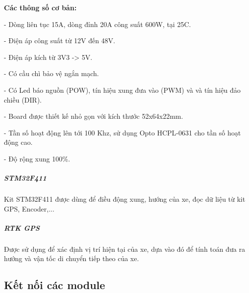 \documentclass[a4paper, 12pt]{article}
\begin{document}
\textbf{Các thông số cơ bản:}

 	- Dòng liên tục 15A, dòng đỉnh 20A công suất 600W, tại 25\degree C.
 	
	- Điện áp công suất từ 12V đến 48V.
	
	- Điện áp kích từ 3V3 -> 5V.
	
	- Có cầu chì bảo vệ ngắn mạch.
	
	- Có Led báo nguồn (POW), tín hiệu xung đưa vào (PWM) và và tín hiệu đảo chiều (DIR).
	
	- Board được thiết kế nhỏ gọn với kích thước 52x64x22mm.
	
	- Tần số hoạt động lên tới 100 Khz, sử dụng Opto HCPL-0631 cho tần số hoạt động cao.
	
	- Độ rộng xung 100\%.
\subparagraph{STM32F411}
Kit STM32F411 được dùng để điều động xung, hướng của xe, đọc dữ liệu từ kit GPS, Encoder,...
\subparagraph{RTK GPS}
Được sử dụng để xác định vị trí hiện tại của xe, dựa vào đó để tính toán đưa ra hướng và vận tốc di chuyển tiếp theo của xe.
\subsection{Kết nối các module}
\end{document}
